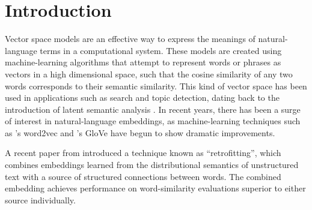 \documentclass[letterpaper]{article}
\title{\thetitle}
\begin{document}
\maketitle
\begin{abstract}


A currently successful approach to computationally represent the meanings of
words is to represent them as vectors (embeddings) in a machine-learned vector
space. These embeddings are often evaluated on their ability to identify
similar or related words like a human would. In this paper, we show the
effectiveness of combining existing embeddings learned by GloVe
\cite{pennington2014glove} with structured knowledge from the semantic network
ConceptNet 5 \cite{speer2012conceptnet}, taking care to merge them into a
common word representation. The resulting vector space has a larger vocabulary
than either source, can represent word meanings in multiple languages, and
achieves state-of-the-art performance on word similarity evaluations.
Its score of $\rho = \scoreRW{}$ on an evaluation of rare words
\cite{luong2013rw} is 13.6\% higher than the previous best known system.

\end{abstract}

\section{Introduction}

Vector space models are an effective way to express the meanings of
natural-language terms in a computational system. These models are created
using machine-learning algorithms that attempt to represent words or phrases as
vectors in a high dimensional space, such that the cosine similarity of any two
words corresponds to their semantic similarity. This kind of vector space has
been used in applications such as search and topic detection, dating back to
the introduction of latent semantic analysis \cite{deerwester1990indexing}.  In
recent years, there has been a surge of interest in natural-language
embeddings, as machine-learning techniques such as
's word2vec and 's
GloVe have begun to show dramatic improvements.

A recent paper from  introduced a technique
known as ``retrofitting'', which combines embeddings learned from the
distributional semantics of unstructured text with a source of structured
connections between words. The combined embedding achieves performance on
word-similarity evaluations superior to either source individually.
\end{document}
